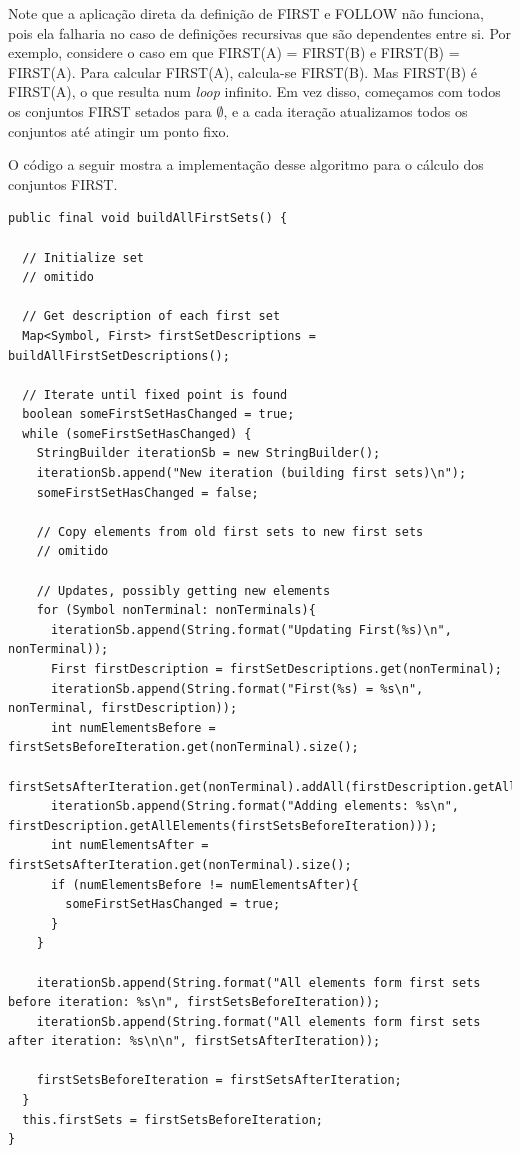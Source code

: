 \documentclass[11pt]{article}
\begin{document}
Note que a aplicação direta da definição de FIRST e FOLLOW não funciona, pois
ela falharia no caso de definições recursivas que são dependentes entre
si. Por exemplo, considere o caso em que FIRST(A) = FIRST(B) e FIRST(B) =
FIRST(A). Para calcular FIRST(A), calcula-se FIRST(B). Mas FIRST(B) é FIRST(A),
o que resulta num \emph{loop} infinito. Em vez disso, começamos com todos os
conjuntos FIRST setados para \(\emptyset\), e a cada iteração atualizamos todos os
conjuntos até atingir um ponto fixo. 

O código a seguir mostra a implementação desse algoritmo para o cálculo dos
conjuntos FIRST.

\begin{verbatim}
public final void buildAllFirstSets() {

  // Initialize set
  // omitido

  // Get description of each first set
  Map<Symbol, First> firstSetDescriptions = buildAllFirstSetDescriptions();

  // Iterate until fixed point is found
  boolean someFirstSetHasChanged = true;
  while (someFirstSetHasChanged) {
    StringBuilder iterationSb = new StringBuilder();
    iterationSb.append("New iteration (building first sets)\n");
    someFirstSetHasChanged = false;

    // Copy elements from old first sets to new first sets
    // omitido

    // Updates, possibly getting new elements
    for (Symbol nonTerminal: nonTerminals){
      iterationSb.append(String.format("Updating First(%s)\n", nonTerminal));
      First firstDescription = firstSetDescriptions.get(nonTerminal);
      iterationSb.append(String.format("First(%s) = %s\n", nonTerminal, firstDescription));
      int numElementsBefore = firstSetsBeforeIteration.get(nonTerminal).size();
      firstSetsAfterIteration.get(nonTerminal).addAll(firstDescription.getAllElements(firstSetsBeforeIteration));
      iterationSb.append(String.format("Adding elements: %s\n", firstDescription.getAllElements(firstSetsBeforeIteration)));
      int numElementsAfter = firstSetsAfterIteration.get(nonTerminal).size();
      if (numElementsBefore != numElementsAfter){
        someFirstSetHasChanged = true;
      }
    }

    iterationSb.append(String.format("All elements form first sets before iteration: %s\n", firstSetsBeforeIteration));
    iterationSb.append(String.format("All elements form first sets after iteration: %s\n\n", firstSetsAfterIteration));

    firstSetsBeforeIteration = firstSetsAfterIteration;
  }
  this.firstSets = firstSetsBeforeIteration;
}
\end{verbatim}
\end{document}
